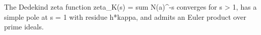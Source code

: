The Dedekind zeta function zeta_K(s) = sum N(a)^{-s} converges for s > 1, has a simple pole at s = 1 with residue h*kappa, and admits an Euler product over prime ideals.
